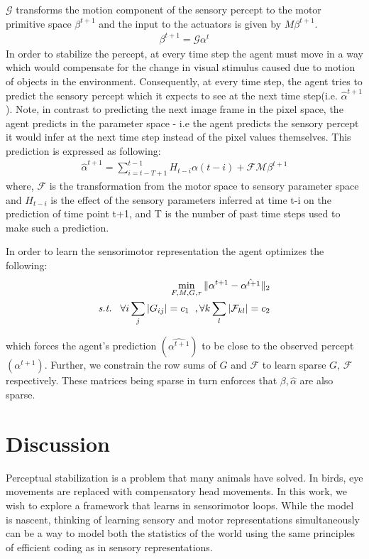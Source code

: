 \documentclass[conference]{IEEEtran}
\begin{document}
$\mathcal{G}$ transforms the motion component of the sensory percept to the motor primitive space $\beta^{t+1}$ and the input to the actuators is given by $M\beta^{t+1}$.
\begin{eqnarray}
\beta^{t+1} = \mathcal{G} \alpha^{t}
\end{eqnarray}
In order to stabilize the percept, at every time step the agent must move in a way which would compensate for the change in visual stimulus caused due to motion of objects in the environment. Consequently, at every time step, the agent tries to predict the sensory percept which it expects to see at the next time step(i.e. $\hat{\alpha}^{t+1}$). Note, in contrast to predicting the next image frame in the pixel space, the agent predicts in the parameter space - i.e the agent predicts the sensory percept it would infer at the next time step instead of the pixel values themselves. This prediction is expressed as following:
\begin{eqnarray}
\hat{\alpha}^{t+1} = \sum_{i=t-T+1}^{t-1}  H_{t-i} \alpha(t-i) + \mathcal{F}\mathcal{M}\beta^{t+1} 
\end{eqnarray}
where, $\mathcal{F}$ is the transformation from the motor space to sensory parameter space and $H_{t-i}$ is the effect of the sensory parameters inferred at time t-i on the prediction of time point t+1, and T is the number of past time steps used to make such a prediction. 

In order to learn the sensorimotor representation the agent optimizes the following:
\begin{eqnarray}
\min_{F,M,G,\tau} \| \alpha^{t+1} - \hat{\alpha^{t+1}} \|_{2} \\
\nonumber \textit{s.t.} \hspace{3mm} \forall i \sum_{j}  |G_{ij}| = c_1  \hspace{2mm}, \forall k \sum_{l}  |\mathcal{F}_{kl}| = c_2 
\end{eqnarray}

which forces the agent's prediction $(\hat{\alpha^{t+1}})$ to be close to the observed percept$({\alpha^{t+1}})$. Further, we constrain the row sums of $G$ and $\mathcal{F}$ to learn sparse $G$, $\mathcal{F}$ respectively. These matrices being sparse in turn enforces that $\beta,\hat{\alpha} $ are also sparse.

\section{Discussion}
Perceptual stabilization is a problem that many animals have solved. In birds, eye movements are replaced with compensatory head movements. In this work, we wish to explore a framework that learns in sensorimotor loops. While the model is nascent, thinking of learning sensory and motor representations simultaneously can be a way to model both the statistics of the world using the same principles of efficient coding as in sensory representations.
\end{document}
